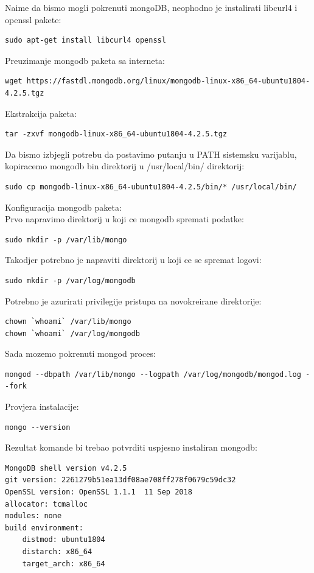 \documentclass[12pt,vi]{mitthesis}
\begin{document}
\noindent
Naime da bismo mogli pokrenuti mongoDB, neophodno je instalirati libcurl4 i openssl pakete:
\begin{lstlisting}[style=BashInputStyle]
sudo apt-get install libcurl4 openssl
\end{lstlisting}
Preuzimanje mongodb paketa sa interneta:
\begin{lstlisting}[style=BashInputStyle]
wget https://fastdl.mongodb.org/linux/mongodb-linux-x86_64-ubuntu1804-4.2.5.tgz
\end{lstlisting}
Ekstrakcija paketa:
\begin{lstlisting}[style=BashInputStyle]
tar -zxvf mongodb-linux-x86_64-ubuntu1804-4.2.5.tgz
\end{lstlisting}
Da bismo izbjegli potrebu da postavimo putanju u PATH sistemsku varijablu, kopiracemo mongodb bin direktorij u /usr/local/bin/ direktorij:
\begin{lstlisting}[style=BashInputStyle]
sudo cp mongodb-linux-x86_64-ubuntu1804-4.2.5/bin/* /usr/local/bin/
\end{lstlisting}
Konfiguracija mongodb paketa:\\
Prvo napravimo direktorij u koji ce mongodb spremati podatke:
\begin{lstlisting}[style=BashInputStyle]
sudo mkdir -p /var/lib/mongo
\end{lstlisting}
Takodjer potrebno je napraviti direktorij u koji ce se spremat logovi:
\begin{lstlisting}[style=BashInputStyle]
sudo mkdir -p /var/log/mongodb
\end{lstlisting}
Potrebno je azurirati privilegije pristupa na novokreirane direktorije:
\begin{lstlisting}[style=BashInputStyle]
chown `whoami` /var/lib/mongo 
chown `whoami` /var/log/mongodb
\end{lstlisting}
Sada mozemo pokrenuti mongod proces:
\begin{lstlisting}[style=BashInputStyle]
mongod --dbpath /var/lib/mongo --logpath /var/log/mongodb/mongod.log --fork
\end{lstlisting}
Provjera instalacije:
\begin{lstlisting}[style=BashInputStyle]
mongo --version
\end{lstlisting}
Rezultat komande bi trebao potvrditi uspjesno instaliran mongodb:
\begin{lstlisting}[style=BashInputStyle]
MongoDB shell version v4.2.5
git version: 2261279b51ea13df08ae708ff278f0679c59dc32
OpenSSL version: OpenSSL 1.1.1  11 Sep 2018
allocator: tcmalloc
modules: none
build environment:
    distmod: ubuntu1804
    distarch: x86_64
    target_arch: x86_64
\end{lstlisting}
\end{document}
